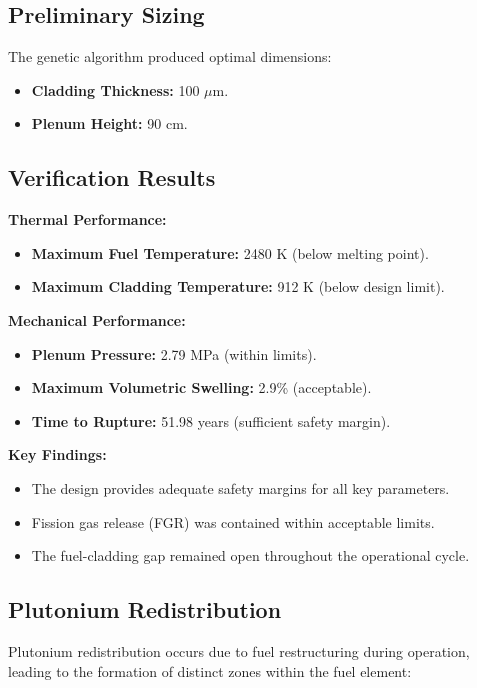 \documentclass[11pt,a4paper,twoside]{article}
\begin{document}
\subsection{Preliminary Sizing}
The genetic algorithm produced optimal dimensions:
\begin{itemize}
    \item \textbf{Cladding Thickness:} 100 $\mu$m.
    \item \textbf{Plenum Height:} 90 cm.
\end{itemize}

\subsection{Verification Results}
\textbf{Thermal Performance:}
\begin{itemize}
    \item \textbf{Maximum Fuel Temperature:} 2480 K (below melting point).
    \item \textbf{Maximum Cladding Temperature:} 912 K (below design limit).
\end{itemize}

\textbf{Mechanical Performance:}
\begin{itemize}
    \item \textbf{Plenum Pressure:} 2.79 MPa (within limits).
    \item \textbf{Maximum Volumetric Swelling:} 2.9\% (acceptable).
    \item \textbf{Time to Rupture:} 51.98 years (sufficient safety margin).
\end{itemize}

\textbf{Key Findings:}
\begin{itemize}
    \item The design provides adequate safety margins for all key parameters.
    \item Fission gas release (FGR) was contained within acceptable limits.
    \item The fuel-cladding gap remained open throughout the operational cycle.
\end{itemize}

\subsection{Plutonium Redistribution}

Plutonium redistribution occurs due to fuel restructuring during operation, leading to the formation of distinct zones within the fuel element:
\end{document}
